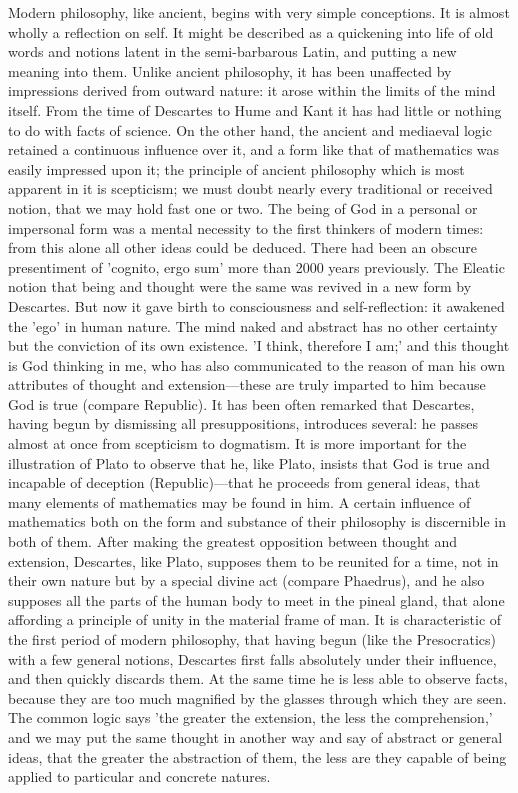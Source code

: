 \documentclass[11pt,letter]{article}
\begin{document}
\par  Modern philosophy, like ancient, begins with very simple conceptions. It is almost wholly a reflection on self. It might be described as a quickening into life of old words and notions latent in the semi-barbarous Latin, and putting a new meaning into them. Unlike ancient philosophy, it has been unaffected by impressions derived from outward nature: it arose within the limits of the mind itself. From the time of Descartes to Hume and Kant it has had little or nothing to do with facts of science. On the other hand, the ancient and mediaeval logic retained a continuous influence over it, and a form like that of mathematics was easily impressed upon it; the principle of ancient philosophy which is most apparent in it is scepticism; we must doubt nearly every traditional or received notion, that we may hold fast one or two. The being of God in a personal or impersonal form was a mental necessity to the first thinkers of modern times: from this alone all other ideas could be deduced. There had been an obscure presentiment of 'cognito, ergo sum' more than 2000 years previously. The Eleatic notion that being and thought were the same was revived in a new form by Descartes. But now it gave birth to consciousness and self-reflection: it awakened the 'ego' in human nature. The mind naked and abstract has no other certainty but the conviction of its own existence. 'I think, therefore I am;' and this thought is God thinking in me, who has also communicated to the reason of man his own attributes of thought and extension—these are truly imparted to him because God is true (compare Republic). It has been often remarked that Descartes, having begun by dismissing all presuppositions, introduces several: he passes almost at once from scepticism to dogmatism. It is more important for the illustration of Plato to observe that he, like Plato, insists that God is true and incapable of deception (Republic)—that he proceeds from general ideas, that many elements of mathematics may be found in him. A certain influence of mathematics both on the form and substance of their philosophy is discernible in both of them. After making the greatest opposition between thought and extension, Descartes, like Plato, supposes them to be reunited for a time, not in their own nature but by a special divine act (compare Phaedrus), and he also supposes all the parts of the human body to meet in the pineal gland, that alone affording a principle of unity in the material frame of man. It is characteristic of the first period of modern philosophy, that having begun (like the Presocratics) with a few general notions, Descartes first falls absolutely under their influence, and then quickly discards them. At the same time he is less able to observe facts, because they are too much magnified by the glasses through which they are seen. The common logic says 'the greater the extension, the less the comprehension,' and we may put the same thought in another way and say of abstract or general ideas, that the greater the abstraction of them, the less are they capable of being applied to particular and concrete natures.
\end{document}
